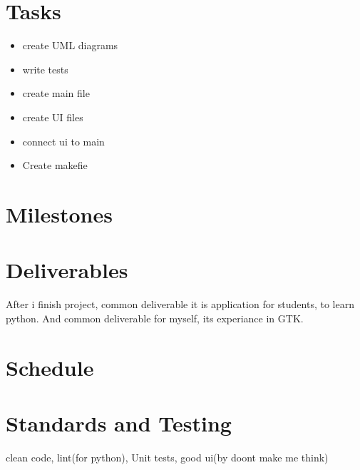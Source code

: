 \documentclass{article}
\begin{document}
  \section{Tasks}
  \begin{itemize}
    \item{create UML diagrams}
    \item{write tests}
    \item{create main file}
    \item{create UI files}
    \item{connect ui to main}
    \item{Create makefie}
  \end{itemize}
  \section{Milestones}
  \section{Deliverables}
  After i finish project, common deliverable it is application for students, to learn python. And common deliverable for myself, its experiance in GTK.
  \section{Schedule}

  \section{Standards and Testing}
  clean code, lint(for python), Unit tests, good ui(by doont make me think)
\end{document}
